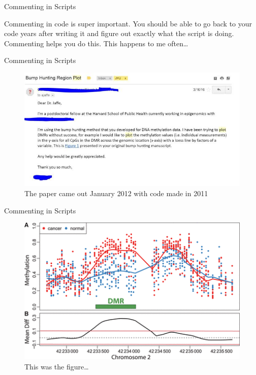 \documentclass[
  ignorenonframetext,
]{beamer}
\begin{document}
\begin{frame}{Commenting in Scripts}
\protect\hypertarget{commenting-in-scripts}{}

Commenting in code is super important. You should be able to go back to
your code years after writing it and figure out exactly what the script
is doing. Commenting helps you do this. This happens to me often\ldots{}

\end{frame}

\begin{frame}{Commenting in Scripts}
\protect\hypertarget{commenting-in-scripts-1}{}

\begin{figure}
\centering
\includegraphics{media/code_request.jpg}
\caption{The paper came out January 2012 with code made in 2011}
\end{figure}

\end{frame}

\begin{frame}{Commenting in Scripts}
\protect\hypertarget{commenting-in-scripts-2}{}

\begin{figure}
\centering
\includegraphics{media/dyr238f1.gif}
\caption{This was the figure\ldots{}}
\end{figure}

\end{frame}
\end{document}
